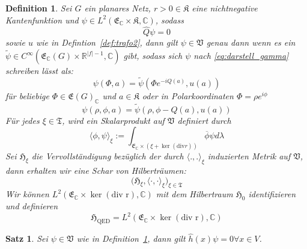 \documentclass[11pt,a4paper,leqno]{report}
\newtheorem{proposition}{Satz}[chapter]
\newtheorem{definition}[theorem]{Definition}
\numberwithin{equation}{chapter}
\begin{document}
\begin{definition}\label{def:QED2}
	Sei $G$ ein planares Netz, \(r>0\in\mathfrak{K}\) eine nichtnegative Kantenfunktion und $\psi\in L^2(\mathfrak{E}_{\mathbb{C}}\times\mathfrak{K},\mathbb{C})$, sodass
	\[
	\hat{Q}\psi=0
	\] sowie \(u\) wie in Defintion~\eqref{def:trafo2}, dann gilt $\psi\in \mathfrak{V}$ genau dann wenn es ein $\tilde{\psi}\in C^\infty(\mathfrak{E}_\mathbb{C}(G)\times\mathbb{R}^{|f|-1}, \mathbb{C})$ gibt, sodass sich $\psi$ nach \ref{eq:darstell_gamma} schreiben lässt als:
	\begin{equation}
		\psi(\Phi, a) = \tilde{\psi}(\Phi e^{-iQ(a)}, u(a))
	\end{equation}
	f\"ur beliebige $\Phi\in\mathfrak{E}(G)_{\mathbb{C}}$ und $a\in\mathfrak{K}$ oder in Polarkoordinaten $\Phi = \rho e^{i\phi}$
	\begin{equation}
		\psi(\rho, \phi, a) = \tilde{\psi}(\rho, \phi-Q(a), u(a))
	\end{equation}
	Für jedes $\xi\in\mathfrak{T}$, wird ein Skalarprodukt auf $\mathfrak{V}$ definiert durch
	\begin{equation}
		\langle \phi, \psi\rangle_{\xi} := \int_{\mathfrak{E}_{\mathbb{C}}\times(\xi + \ker(\mathrm{div}r))}\overline{\phi}\psi d\lambda\label{eq:integrant2}
	\end{equation}
	Sei $\mathfrak{H}_{\xi}$ die Vervollständigung bezüglich der durch $\langle ., .\rangle_{\xi}$ induzierten Metrik auf $\mathfrak{V}$, dann erhalten wir eine
	Schar von Hilberträumen:
	\[
	\bigl(\mathfrak{H}_\xi, \langle \cdot,\cdot\rangle_\xi \bigr)_{\xi \in \mathfrak{T}}
	\]
	Wir können $L^2(\mathfrak{E}_{\mathbb{C}}\times\ker(\text{div r}),\mathbb{C})$ mit dem Hilbertraum $\mathfrak{H}_0$ identifizieren und definieren \[\mathfrak{H}_\mathrm{QED}=L^2(\mathfrak{E}_{\mathbb{C}}\times\ker(\text{div r}),\mathbb{C})\]
\end{definition}
\begin{proposition}
	Sei $\psi\in\mathfrak{V}$ wie in Definition~\ref{def:QED2}, dann gilt 
	$\hat{h}(x)\psi=0\forall x\in V$. 
\end{proposition}
\end{document}

